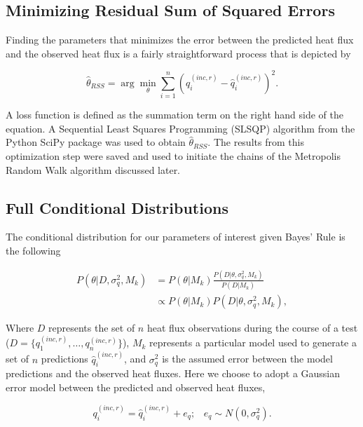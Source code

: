 \documentclass[article]{proc}
\begin{document}
    \subsection{Minimizing Residual Sum of Squared Errors}

        Finding the parameters that minimizes the error between the predicted heat flux and the observed heat flux is a fairly straightforward process that is depicted by

        \begin{equation}\label{eq:rss}
            \hat{\theta}_{RSS} = \arg \min_{\theta}  \sum_{i=1}^n \left(q_i^{(inc,r)} - \hat{q}_i^{(inc,r)} \right)^2.
        \end{equation}

        \noindent A loss function is defined as the summation term on the right hand side of the equation. A Sequential Least Squares Programming (SLSQP) algorithm from the Python SciPy package was used to obtain $\hat{\theta}_{RSS}$. The results from this optimization step were saved and used to initiate the chains of the Metropolis Random Walk algorithm discussed later. 


    \subsection{Full Conditional Distributions}

        The conditional distribution for our parameters of interest given Bayes' Rule is the following

        \begin{align}\label{eq:bayes}
            P(\theta | D, \sigma_q^2, M_k) &= P(\theta|M_k) \frac{P(D|\theta, \sigma_q^2, M_k)}{P(D|M_k)}\\
                &\propto P(\theta|M_k) P(D|\theta, \sigma_q^2, M_k),
        \end{align}

        \noindent Where $D$ represents the set of $n$ heat flux observations during the course of a test ($D = \{q^{(inc,r)}_1, \dots, q^{(inc,r)}_n \}$), $M_k$ represents a particular model used to generate a set of $n$ predictions $\hat{q}^{(inc,r)}_i$, and $\sigma_q^2$ is the assumed error between the model predictions and the observed heat fluxes. Here we choose to adopt a Gaussian error model between the predicted and observed heat fluxes,

        \begin{equation}\label{eq:model}
            q^{(inc,r)}_i = \hat{q}^{(inc,r)}_i + e_q; \hspace{10pt} e_q \sim N(0, \sigma_q^2). 
        \end{equation}
\end{document}
